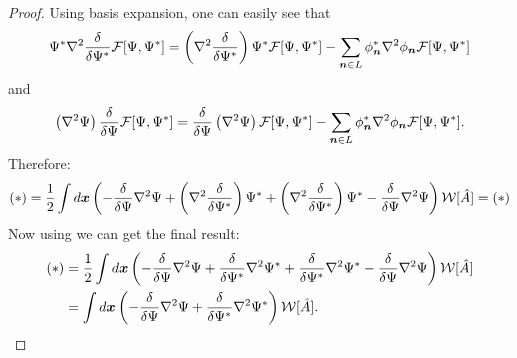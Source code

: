 \begin{proof}
Using basis expansion, one can easily see that
\[
	\Psi^* \nabla^2 \frac{\delta}{\delta \Psi^*} \mathcal{F}[\Psi, \Psi^*]
	= \left( \nabla^2 \frac{\delta}{\delta \Psi^*} \right) \Psi^* \mathcal{F}[\Psi, \Psi^*]
	- \sum_{\boldsymbol{n} \in L} \phi_{\boldsymbol{n}}^* \nabla^2 \phi_{\boldsymbol{n}} \mathcal{F}[\Psi, \Psi^*]
\]
and
\[
	\left( \nabla^2 \Psi \right) \frac{\delta}{\delta \Psi} \mathcal{F}[\Psi, \Psi^*]
	= \frac{\delta}{\delta \Psi} \left( \nabla^2 \Psi \right) \mathcal{F}[\Psi, \Psi^*]
	- \sum_{\boldsymbol{n} \in L} \phi_{\boldsymbol{n}}^* \nabla^2 \phi_{\boldsymbol{n}} \mathcal{F}[\Psi, \Psi^*].
\]
Therefore:
\begin{equation*}
\begin{split}
	(*)
	= \frac{1}{2} \int d\boldsymbol{x} \left(
		- \frac{\delta}{\delta \Psi} \nabla^2 \Psi
		+ \left( \nabla^2 \frac{\delta}{\delta \Psi^*} \right) \Psi^*
		+ \left( \nabla^2 \frac{\delta}{\delta \Psi^*} \right) \Psi^*
		- \frac{\delta}{\delta \Psi} \nabla^2 \Psi
	\right)
	\mathcal{W}[\hat{A}] = (*)
\end{split}
\end{equation*}
Now using  we can get the final result:
\begin{equation*}
\begin{split}
	(*)
	& = \frac{1}{2} \int d\boldsymbol{x} \left(
		- \frac{\delta}{\delta \Psi} \nabla^2 \Psi
		+ \frac{\delta}{\delta \Psi^*} \nabla^2 \Psi^*
		+ \frac{\delta}{\delta \Psi^*} \nabla^2 \Psi^*
		- \frac{\delta}{\delta \Psi} \nabla^2 \Psi
	\right)
	\mathcal{W}[\hat{A}] \\
	& = \int d\boldsymbol{x} \left(
		- \frac{\delta}{\delta \Psi} \nabla^2 \Psi
		+ \frac{\delta}{\delta \Psi^*} \nabla^2 \Psi^*
	\right) \mathcal{W}[\hat{A}].
	\qedhere
\end{split}
\end{equation*}
\end{proof}

